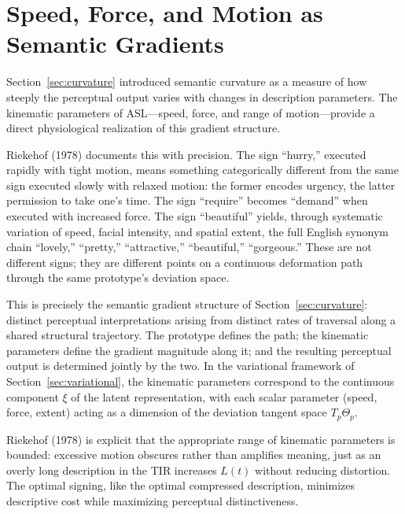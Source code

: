 \documentclass[11pt,a4paper]{article}
\theoremstyle{definition}
\theoremstyle{remark}
\begin{document}
\section{Speed, Force, and Motion as Semantic Gradients}
\label{sec:asl_intensity}

Section~\ref{sec:curvature} introduced semantic curvature as a measure of how steeply the perceptual output varies with changes in description parameters. The kinematic parameters of ASL---speed, force, and range of motion---provide a direct physiological realization of this gradient structure.

Riekehof (1978) documents this with precision. The sign ``hurry,'' executed rapidly with tight motion, means something categorically different from the same sign executed slowly with relaxed motion: the former encodes urgency, the latter permission to take one's time. The sign ``require'' becomes ``demand'' when executed with increased force. The sign ``beautiful'' yields, through systematic variation of speed, facial intensity, and spatial extent, the full English synonym chain ``lovely,'' ``pretty,'' ``attractive,'' ``beautiful,'' ``gorgeous.'' These are not different signs; they are different points on a continuous deformation path through the same prototype's deviation space.

This is precisely the semantic gradient structure of Section~\ref{sec:curvature}: distinct perceptual interpretations arising from distinct rates of traversal along a shared structural trajectory. The prototype defines the path; the kinematic parameters define the gradient magnitude along it; and the resulting perceptual output is determined jointly by the two. In the variational framework of Section~\ref{sec:variational}, the kinematic parameters correspond to the continuous component $\xi$ of the latent representation, with each scalar parameter (speed, force, extent) acting as a dimension of the deviation tangent space $T_p \Theta_p$.

Riekehof (1978) is explicit that the appropriate range of kinematic parameters is bounded: excessive motion obscures rather than amplifies meaning, just as an overly long description in the TIR increases $L(t)$ without reducing distortion. The optimal signing, like the optimal compressed description, minimizes descriptive cost while maximizing perceptual distinctiveness.

\end{document}
